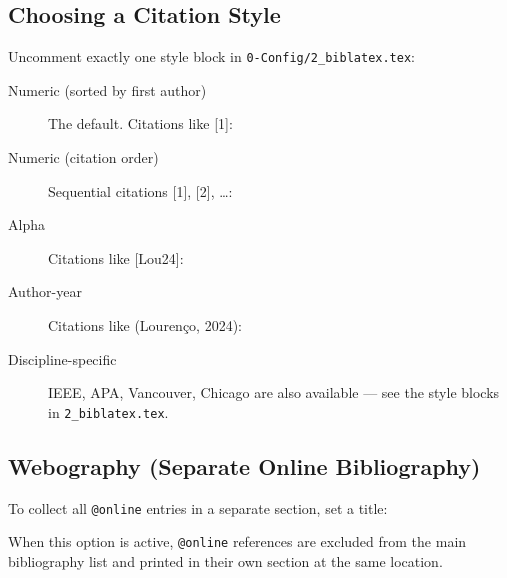 \subsection{Choosing a Citation Style}
\label{sub:bib_style}

Uncomment exactly one style block in \verb!0-Config/2_biblatex.tex!:

\begin{description}
  \item[Numeric (sorted by first author)] The default.  Citations like [1]:
\begin{latexcode}
\end{latexcode}

  \item[Numeric (citation order)] Sequential citations [1], [2], \ldots:
\begin{latexcode}
\end{latexcode}

  \item[Alpha] Citations like [Lou24]:
\begin{latexcode}
\end{latexcode}

  \item[Author-year] Citations like (Lourenço, 2024):
\begin{latexcode}
\end{latexcode}

  \item[Discipline-specific] IEEE, APA, Vancouver, Chicago are also
    available — see the style blocks in \verb!2_biblatex.tex!.
\end{description}

\subsection{Webography (Separate Online Bibliography)}
\label{sub:webography}

To collect all \verb!@online! entries in a separate section, set a title:
\begin{latexcode}
\end{latexcode}
When this option is active, \verb!@online! references are excluded from the
main bibliography list and printed in their own section at the same location.


